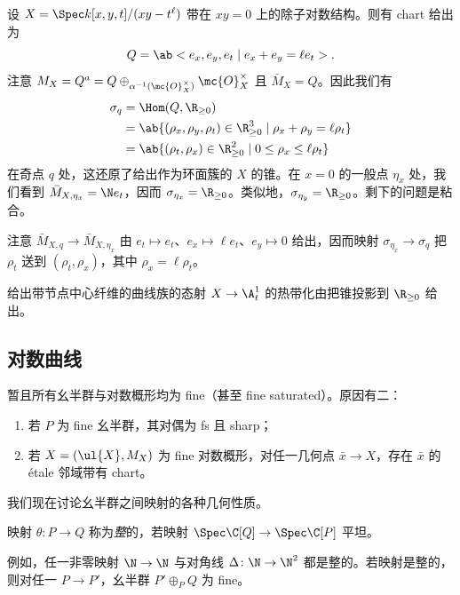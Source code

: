 \begin{exm}
    设 \(X = \Spec k[x,y,t]/(xy-t^{\ell})\) 带在 \(xy = 0\) 上的除子对数结构。则有 chart 给出为
    \[ Q = \ab<e_x, e_y, e_t \mid e_x + e_y = \ell e_t>. \]
    注意 \(M_X = Q^a = Q \oplus_{\alpha^{-1}(\mc{O}_X^{\times})} \mc{O}_X^{\times}\) 且 \(\bar{M}_X = Q\)。因此我们有
    \begin{align*}
        \sigma_q &= \Hom(Q, \R_{\geq 0}) \\
        &= \ab\{ (\rho_x, \rho_y, \rho_t) \in \R_{\geq 0}^3 \mid \rho_x + \rho_y = \ell \rho_t \} \\
        &= \ab\{ (\rho_t, \rho_x) \in \R_{\geq 0}^2 \mid 0 \leq \rho_x \leq \ell \rho_t \}
    \end{align*}
    在奇点 \(q\) 处，这还原了给出作为环面簇的 \(X\) 的锥。在 \(x = 0\) 的一般点 \(\eta_x\) 处，我们看到 \(\bar{M}_{X, \eta_x} = \N e_t\)，因而 \(\sigma_{\eta_x} = \R_{\geq 0}\)。类似地，\(\sigma_{\eta_y} = \R_{\geq 0}\)。剩下的问题是粘合。

    注意 \(\bar{M}_{X, q} \to \bar{M}_{X, \eta_x}\) 由 \(e_t \mapsto e_t\)、\(e_x \mapsto \ell e_t\)、\(e_y \mapsto 0\) 给出，因而映射 \(\sigma_{\eta_x} \to \sigma_q\) 把 \(\rho_t\) 送到 \((\rho_t, \rho_x)\)，其中 \(\rho_x = \ell \rho_t\)。

    给出带节点中心纤维的曲线族的态射 \(X \to \A^1_t\) 的热带化由把锥投影到 \(\R_{\geq 0}\) 给出。
\end{exm}


\subsection{对数曲线}%
\label{sub:Log curves}

暂且所有幺半群与对数概形均为 fine（甚至 fine saturated）。原因有二：
\begin{enumerate}
    \item 若 \(P\) 为 fine 幺半群，其对偶为 fs 且 sharp；
    \item 若 \(X = (\ul{X}, M_X)\) 为 fine 对数概形，对任一几何点 \(\bar{x} \to X\)，存在 \(\bar{x}\) 的 \'etale 邻域带有 chart。
\end{enumerate}

我们现在讨论幺半群之间映射的各种几何性质。
\begin{defn}
    映射 \(\theta \colon P \to Q\) 称为\textit{整}的，若映射 \(\Spec\C[Q] \to \Spec \C[P]\) 平坦。
\end{defn}

例如，任一非零映射 \(\N \to \N\) 与对角线 \(\Delta \colon\N \to \N^2\) 都是整的。若映射是整的，则对任一 \(P \to P'\)，幺半群 \(P' \oplus_P Q\) 为 fine。

